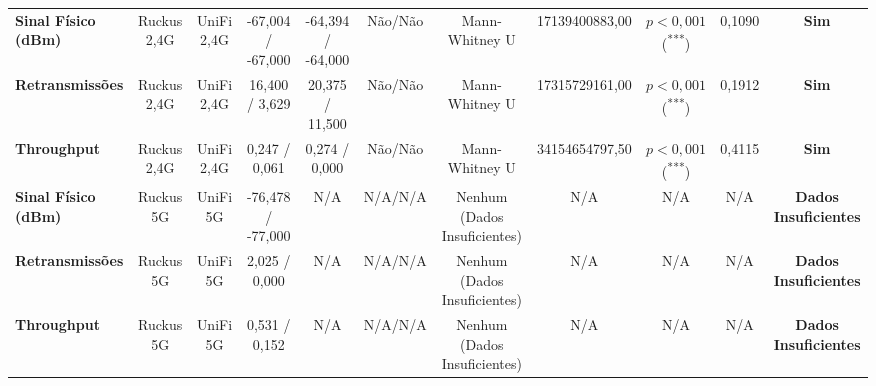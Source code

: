 \begin{table}[H]
{{\begin{tabular}{lcccccccccc}
      \textbf{Sinal Físico (dBm)} & Ruckus 2,4G & UniFi 2,4G & -67,004 / -67,000 & -64,394 / -64,000 & Não/Não & Mann-Whitney U & 17139400883,00 & $p < 0,001$ (\textsuperscript{***}) & 0,1090 & \textbf{Sim} \\
      \textbf{Retransmissões} & Ruckus 2,4G & UniFi 2,4G & 16,400 / 3,629 & 20,375 / 11,500 & Não/Não & Mann-Whitney U & 17315729161,00 & $p < 0,001$ (\textsuperscript{***}) & 0,1912 & \textbf{Sim} \\
      \textbf{Throughput} & Ruckus 2,4G & UniFi 2,4G & 0,247 / 0,061 & 0,274 / 0,000 & Não/Não & Mann-Whitney U & 34154654797,50 & $p < 0,001$ (\textsuperscript{***}) & 0,4115 & \textbf{Sim} \\
      \textbf{Sinal Físico (dBm)} & Ruckus 5G & UniFi 5G & -76,478 / -77,000 & N/A & N/A/N/A & Nenhum (Dados Insuficientes) & N/A & N/A & N/A & \textbf{Dados Insuficientes} \\
      \textbf{Retransmissões} & Ruckus 5G & UniFi 5G & 2,025 / 0,000 & N/A & N/A/N/A & Nenhum (Dados Insuficientes) & N/A & N/A & N/A & \textbf{Dados Insuficientes} \\
      \textbf{Throughput} & Ruckus 5G & UniFi 5G & 0,531 / 0,152 & N/A & N/A/N/A & Nenhum (Dados Insuficientes) & N/A & N/A & N/A & \textbf{Dados Insuficientes} \\
      \bottomrule
    \end{tabular}%
  }%
}{%
}
\end{table}

